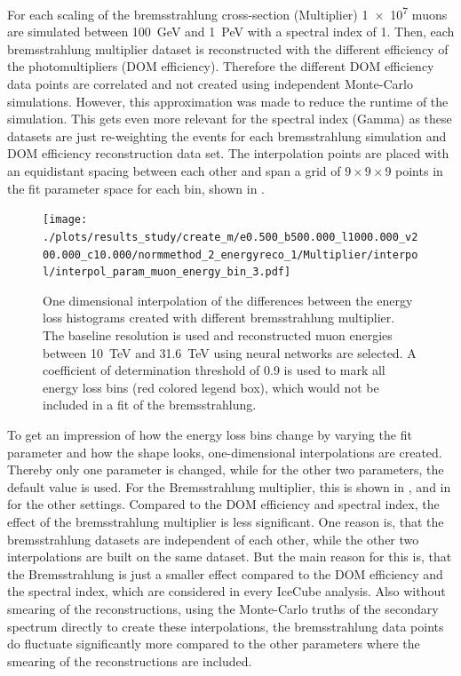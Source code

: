 For each scaling of the bremsstrahlung cross-section (Multiplier) \num{1e7} muons are simulated between \SI{100}{GeV} and \SI{1}{PeV} with a spectral index of \num{1}.
Then, each bremsstrahlung multiplier dataset is reconstructed with the different efficiency of the photomultipliers (DOM efficiency).
Therefore the different DOM efficiency data points are correlated and not created using independent Monte-Carlo simulations.
However, this approximation was made to reduce the runtime of the simulation.
This gets even more relevant for the spectral index (Gamma) as these datasets are just re-weighting the events for each bremsstrahlung simulation and DOM efficiency reconstruction data set.
The interpolation points are placed with an equidistant spacing between each other and span a grid of $9\times9\times9$ points in the fit parameter space for each bin, shown in .
\begin{figure}
    \centering
    \texttt{[image: ./plots/results\_study/create\_m/e0.500\_b500.000\_l1000.000\_v200.000\_c10.000/normmethod\_2\_energyreco\_1/Multiplier/interpol/interpol\_param\_muon\_energy\_bin\_3.pdf]}
    \caption{One dimensional interpolation of the differences between the energy loss histograms created with different bremsstrahlung multiplier. The baseline resolution is used and reconstructed muon energies between \SI{10}{TeV} and \SI{31.6}{TeV} using neural networks are selected. A coefficient of determination threshold of \num{0.9} is used to mark all energy loss bins (red colored legend box), which would not be included in a fit of the bremsstrahlung.}
    \label{fig:study_1d_interpol_mu3_te}
\end{figure}


To get an impression of how the energy loss bins change by varying the fit parameter and how the shape looks, one-dimensional interpolations are created.
Thereby only one parameter is changed, while for the other two parameters, the default value is used.
For the Bremsstrahlung multiplier, this is shown in , and in  for the other settings.
Compared to the DOM efficiency and spectral index, the effect of the bremsstrahlung multiplier is less significant.
One reason is, that the bremsstrahlung datasets are independent of each other, while the other two interpolations are built on the same dataset.
But the main reason for this is, that the Bremsstrahlung is just a smaller effect compared to the DOM efficiency and the spectral index, which are considered in every IceCube analysis.
Also without smearing of the reconstructions, using the Monte-Carlo truths of the secondary spectrum directly to create these interpolations, the bremsstrahlung data points do fluctuate significantly more compared to the other parameters where the smearing of the reconstructions are included.

